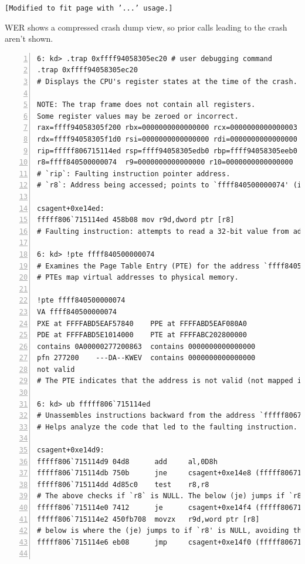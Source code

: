 \begin{center}
    \texttt{[Modified to fit page with '...' usage.]}
\end{center}

\newpage

\noindent
WER shows a compressed crash dump view, so prior calls leading to the crash aren't shown.

\begin{lstlisting}[caption=Debugging csagent.sys Module (\# comments), numbers=left]
6: kd> .trap 0xffff94058305ec20 # user debugging command
.trap 0xffff94058305ec20
# Displays the CPU's register states at the time of the crash.

NOTE: The trap frame does not contain all registers.
Some register values may be zeroed or incorrect.
rax=ffff94058305f200 rbx=0000000000000000 rcx=0000000000000003
rdx=ffff94058305f1d0 rsi=0000000000000000 rdi=0000000000000000
rip=fffff806715114ed rsp=ffff94058305edb0 rbp=ffff94058305eeb0
r8=ffff840500000074  r9=0000000000000000 r10=0000000000000000
# `rip`: Faulting instruction pointer address.
# `r8`: Address being accessed; points to `ffff840500000074' (invalid memory).

csagent+0xe14ed:
fffff806`715114ed 458b08 mov r9d,dword ptr [r8]
# Faulting instruction: attempts to read a 32-bit value from address stored in `r8`.

6: kd> !pte ffff840500000074
# Examines the Page Table Entry (PTE) for the address `ffff840500000074.'
# PTEs map virtual addresses to physical memory.

!pte ffff840500000074
VA ffff840500000074
PXE at FFFFABD5EAF57840    PPE at FFFFABD5EAF080A0
PDE at FFFFABD5E1014000    PTE at FFFFABC202800000
contains 0A00000277200863  contains 0000000000000000
pfn 277200    ---DA--KWEV  contains 0000000000000000
not valid
# The PTE indicates that the address is not valid (not mapped in memory).

6: kd> ub fffff806`715114ed
# Unassembles instructions backward from the address `fffff806715114ed`.
# Helps analyze the code that led to the faulting instruction.

csagent+0xe14d9:
fffff806`715114d9 04d8      add     al,0D8h
fffff806`715114db 750b      jne     csagent+0xe14e8 (fffff806715114e8)
fffff806`715114dd 4d85c0    test    r8,r8 
# The above checks if `r8` is NULL. The below (je) jumps if `r8' is NULL.
fffff806`715114e0 7412      je      csagent+0xe14f4 (fffff806715114f4) 
fffff806`715114e2 450fb708  movzx   r9d,word ptr [r8]
# below is where the (je) jumps to if `r8' is NULL, avoiding the `r8' read above.
fffff806`715114e6 eb08      jmp     csagent+0xe14f0 (fffff806715114f0)


\end{lstlisting}
